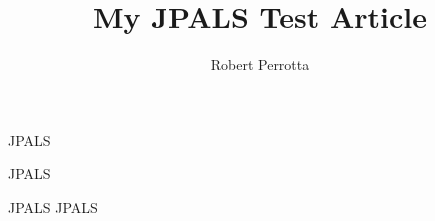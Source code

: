 \documentclass[11pt]{article}
\title{My \acs*{JPALS} Test Article}
\author{Robert Perrotta}
\begin{document}
\maketitle

\ac{JPALS}

\ac{JPALS}

\ac{JPALS} JPALS


\end{document}
